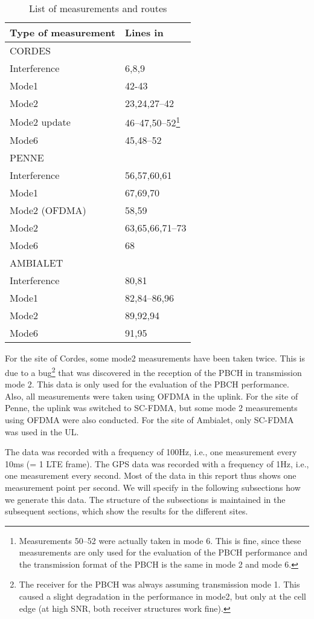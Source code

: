 \documentclass[a4paper,10pt]{article}
\begin{document}
\begin{table}
\centering
\begin{tabular}{l|l}
\hline
Type of measurement & Lines in \cite{measurements_spreadsheet} \\ 
\hline
\hline
CORDES\\
\hline
Interference & 6,8,9 \\ 
Mode1 & 42-43 \\ 
Mode2 & 23,24,27--42\\
Mode2 update & 46--47,50--52\footnote{Measurements 50--52 were actually taken in mode 6. This is fine, since these measurements are only used for the evaluation of the PBCH performance and the transmission format of the PBCH is the same in mode 2 and mode 6.}\\ 
Mode6 & 45,48--52 \\ 
\hline
PENNE\\
\hline
Interference & 56,57,60,61 \\ 
Mode1 & 67,69,70 \\ 
Mode2 (OFDMA) &  58,59\\ 
Mode2 &  63,65,66,71--73\\ 
Mode6 &  68\\ 
\hline
AMBIALET\\
\hline
Interference &  80,81\\ 
Mode1 & 82,84--86,96\\ 
Mode2 &  89,92,94\\ 
Mode6 &  91,95\\ 

\end{tabular}
\caption{List of measurements and routes}
\label{tab:meas_list}
\end{table}
 
For the site of Cordes, some mode2 measurements have been taken twice. This is due to a bug\footnote{The receiver for the PBCH was always assuming transmission mode 1. This caused a slight degradation in the performance in mode2, but only at the cell edge (at high SNR, both receiver structures work fine).} that was discovered in the reception of the PBCH in transmission mode 2. This data is only used for the evaluation of the PBCH performance. Also, all measurements were taken using OFDMA in the uplink. For the site of Penne, the uplink was switched to SC-FDMA, but some mode 2 measurements using OFDMA were also conducted. For the site of Ambialet, only SC-FDMA was used in the UL.

The data was recorded with a frequency of 100Hz, i.e., one measurement every 10ms (= 1 LTE frame). The GPS data was recorded with a frequency of 1Hz, i.e., one measurement every second. Most of the data in this report thus shows one measurement point per second. We will specify in the following subsections how we generate this data. The structure of the subsections is maintained in the subsequent sections, which show the results for the different sites. 
\end{document}
